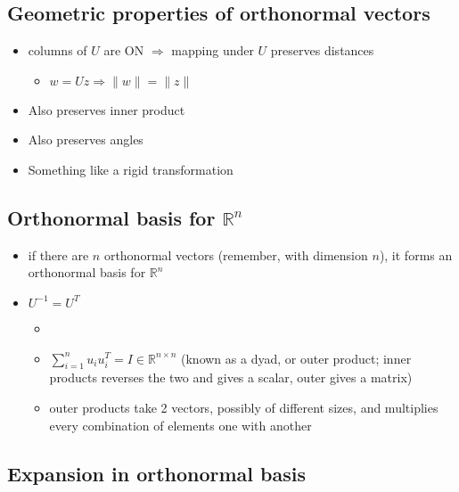 \documentclass[10pt,letterpaper]{article}
\begin{document}
\subsection{Geometric properties of orthonormal vectors}
\label{sec-3_1}

\begin{itemize}
\item columns of $U$ are ON $\Rightarrow$ mapping under $U$ preserves distances

\begin{itemize}
\item $w=Uz \Rightarrow \|w \| = \| z \|$
\end{itemize}

\item Also preserves inner product
\item Also preserves angles
\item Something like a rigid transformation
\end{itemize}
\subsection{Orthonormal basis for $\mathbb{R}^{n}$}
\label{sec-3_2}

\begin{itemize}
\item if there are $n$ orthonormal vectors (remember, with dimension $n$), it forms an orthonormal basis for $\mathbb{R}^{n}$
\item $U^{-1}=U^T$

\begin{itemize}
\item {}
\item $\displaystyle \sum _{i=1} ^{n} u_i u_i^T = I \in \mathbb{R}^{n \times n}$ (known as a dyad, or outer product; inner products reverses the two and gives a scalar, outer gives a matrix)
\item outer products take 2 vectors, possibly of different sizes, and multiplies every combination of elements one with another
\end{itemize}

\end{itemize}
\subsection{Expansion in orthonormal basis}
\label{sec-3_3}
\end{document}
